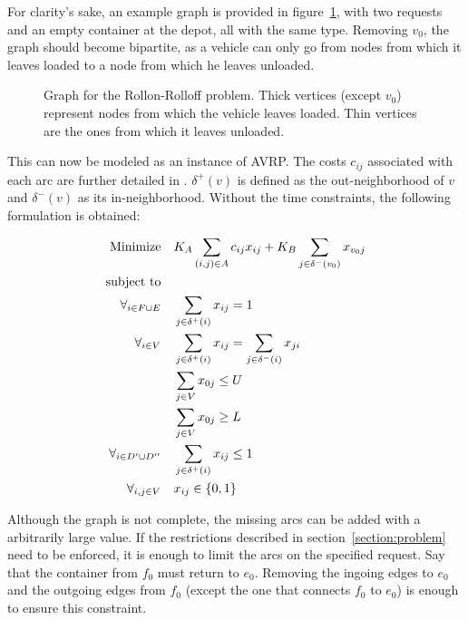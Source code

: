 For clarity's sake, an example graph is provided in figure~\ref{fig:avrp-rr},
with two requests and an empty container at the depot, all with the same type.
Removing $v_0$, the graph should become bipartite, as a vehicle can only go
from nodes from which it leaves loaded to a node from which he leaves unloaded.

\begin{figure}[th]
  \begin{center}
    \leavevmode
    
    \caption{Graph for the Rollon-Rolloff problem. Thick vertices (except
    $v_0$) represent nodes from which the vehicle leaves loaded. Thin vertices
    are the ones from which it leaves unloaded.}
    \label{fig:avrp-rr}
  \end{center}
\end{figure}

This can now be modeled as an instance of AVRP. The costs $c_{ij}$ associated
with each arc are further detailed in \citet{Aringhieri04}.  $\delta^+(v)$ is
defined as the out-neighborhood of $v$ and $\delta^-(v)$ as its
in-neighborhood. Without the time constraints, the following formulation is
obtained:

\begin{align}
	\mbox{Minimize} & \quad K_A \sum_{(i, j) \in A} c_{ij} x_{ij} +
				K_B \sum_{j \in \delta^-(v_0)} x_{v_0j}
	\\
	\mbox{subject to} & \notag{}
	\\
	\forall_{i \in F \cup E} & \quad \sum_{j \in \delta^+(i)} x_{ij} = 1
	\label{avrp-rr:indegree}
	\\
	\forall_{i \in V} & \quad \sum_{j \in \delta^+(i)} x_{ij} = \sum_{j \in \delta^-(i)} x_{ji}
	\label{avrp-rr:in-out}
	\\
	& \quad \sum_{j \in V} x_{0j} \leq U \label{avrp-rr:upper-k} \\
	& \quad \sum_{j \in V} x_{0j} \geq L \label{avrp-rr:lower-k} \\
	\forall_{i \in D^\prime \cup D^{\prime\prime}} & \quad \sum_{j \in \delta^+(i)} x_{ij} \leq 1 \\
	\forall_{i, j \in V} & \quad x_{ij} \in \{0, 1\}
\end{align}

Although the graph is not complete, the missing arcs can be added with a
arbitrarily large value. If the restrictions described in
section~\ref{section:problem} need to be enforced, it is enough to limit the arcs on
the specified request. Say that the container from $f_0$ must return to $e_0$.
Removing the ingoing edges to $e_0$ and the outgoing edges from $f_0$ (except
the one that connects $f_0$ to $e_0$) is enough to ensure this constraint.




